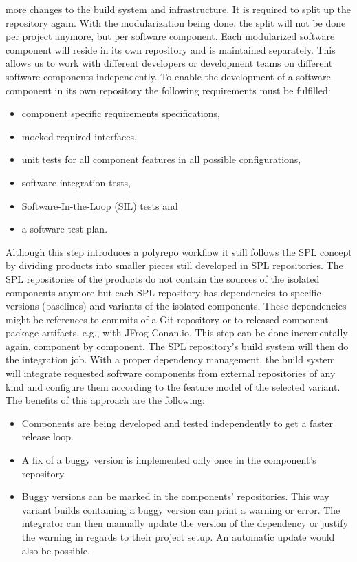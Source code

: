 more changes to the build system and infrastructure. It is required to split up
the repository again. With the modularization being done, the split will not be
done per project anymore, but per software component. Each modularized software
component will reside in its own repository and is maintained separately. This
allows us to work with different developers or development teams on different
software components independently. To enable the development of a software
component in its own repository the following requirements must be fulfilled:
\begin{itemize}
  \item component specific requirements specifications,
  \item mocked required interfaces,
  \item unit tests for all component features in all possible configurations,
  \item software integration tests,
  \item Software-In-the-Loop (SIL) tests and
  \item a software test plan.
\end{itemize}
Although this step introduces a polyrepo workflow it still follows the SPL
concept by dividing products into smaller pieces still developed in SPL
repositories. The SPL repositories of the products do not contain the sources of
the isolated components anymore but each SPL repository has dependencies to
specific versions (baselines) and variants of the isolated components. These
dependencies might be references to commits of a Git repository or to released
component package artifacts, e.g., with JFrog Conan.io. This step can be done
incrementally again, component by component. The SPL repository's build system
will then do the integration job. With a proper dependency management, the build
system will integrate requested software components from external repositories
of any kind and configure them according to the feature model of the selected
variant. The benefits of this approach are the following:
\begin{itemize}
  \item Components are being developed and tested independently to get a faster
        release loop.
  \item A fix of a buggy version is implemented only once in the component's
        repository.
  \item Buggy versions can be marked in the components' repositories. This way
        variant builds containing a buggy version can print a warning or error.
        The integrator can then manually update the version of the dependency or
        justify the warning in regards to their project setup. An automatic
        update would also be possible.
\end{itemize}
